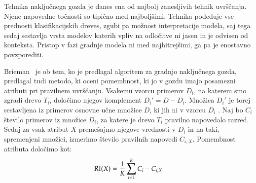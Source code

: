 Tehnika naključnega gozda je danes ena od najbolj zanesljivih tehnik uvrščanja. Njene napovedne točnosti so tipično med najboljšimi. Tehnika podeduje vse prednosti klasifikacijskih dreves, zgubi pa možnost interpretacije modela, saj tega sedaj sestavlja vrsta modelov katerih vpliv na odločitve ni jasen in je odvisen od konteksta. Pristop v fazi gradnje modela ni med najhitrejšimi, ga pa je enostavno povzporediti.

Brieman~\cite{} je ob tem, ko je predlagal algoritem za gradnjo naključnega gozda, predlagal tudi metodo, ki oceni pomembnost, ki jo v gozdu imajo posamezni atributi pri pravilnem uvrščanju. Vsakemu vzorcu primerov $D_i$, na katerem smo zgradi drevo $T_i$,  določimo njegov komplement $D_i'=D-D_i$. Množica $D_i'$ je torej sestavljena iz primerov osnovne učne množice $D$, ki jih ni v vzorcu $D_i$ . Naj bo $C_i$ število primerov iz množice $D_i$, za katere je drevo $T_i$ pravilno napovedalo razred. Sedaj za vsak atribut $X$ premešajmo njegove vrednosti v $D_i$ in na taki, spremenjeni množici, izmerimo število pravilnih napovedi $C_{i,X}$. Pomembnost  atributa določimo kot:
%
$$ {\rm RI}(X)= {1\over K}\sum_{i=1}^K{C_i - C_{i,X}} $$

